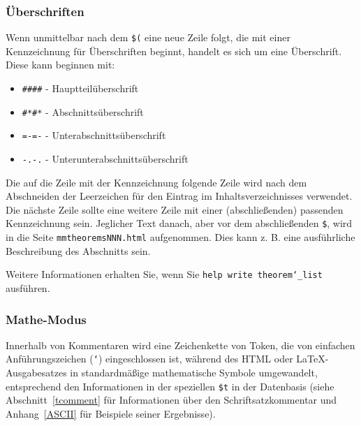 \subsubsection{Überschriften}\label{commentheadings}

Wenn unmittelbar nach dem \texttt{\$(} eine neue Zeile folgt, die mit einer Kennzeichnung für Überschriften beginnt, handelt es sich um eine Überschrift. Diese kann beginnen mit:

\begin{itemize}
 \item[] \texttt{\#\#\#\#} - Hauptteilüberschrift
 \item[] \texttt{\#*\#*} - Abschnittsüberschrift
 \item[] \texttt{=-=-} - Unterabschnittsüberschrift
 \item[] \texttt{-.-.} - Unterunterabschnittsüberschrift
\end{itemize}

Die auf die Zeile mit der Kennzeichnung folgende Zeile wird nach dem Abschneiden der Leerzeichen für den Eintrag im Inhaltsverzeichnisses verwendet. Die nächste Zeile sollte eine weitere Zeile mit einer (abschließenden) passenden Kennzeichnung sein. Jeglicher Text danach, aber vor dem abschließenden \texttt{\$}, wird in die Seite \texttt{mmtheoremsNNN.html} aufgenommen. Dies kann  z. B. eine ausführliche Beschreibung des Abschnitts sein.

Weitere Informationen erhalten Sie, wenn Sie \texttt{help write theorem\char`\_list} ausführen.

\subsubsection{Mathe-Modus}
\label{mathcomments}

Innerhalb von Kommentaren wird eine Zeichenkette von Token, die von einfachen Anführungszeichen (\texttt{`}) eingeschlossen ist, während des {\sc HTML} oder \LaTeX-Ausgabesatzes in standardmäßige mathematische Symbole umgewandelt,  entsprechend den Informationen in der speziellen \texttt{\$t}  in der Datenbasis (siehe Abschnitt~\ref{tcomment} für Informationen über den Schriftsatzkommentar und Anhang~\ref{ASCII} für Beispiele seiner Ergebnisse).

